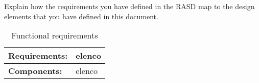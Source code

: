 Explain how the requirements you have defined in the RASD map to the design elements that you have defined in this document.



\begin{table}[H]
    \centering
    \begin{tabular}{|p{3cm}|p{12cm}|}    \hline
        \textbf{Requirements:} & elenco \\
    \hline
        \textbf{Components:} & elenco\\
        
    \hline
    \end{tabular}
    \caption{Functional requirements}
    \label{tab:requirements}
\end{table}
